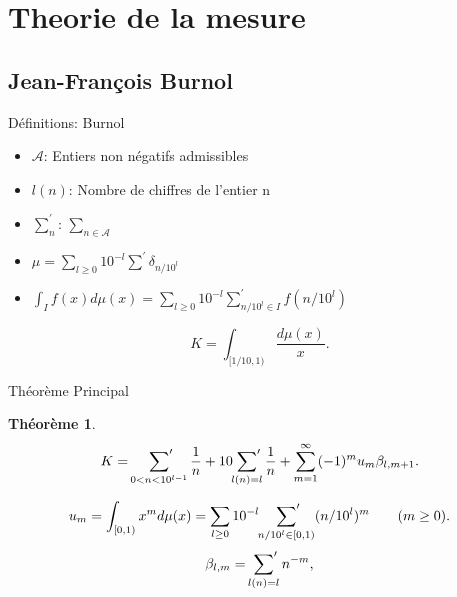 \documentclass{beamer}
\newcommand{\A}{\mathcal{A}}
\newcommand{\sump}{\sideset{}{'}\sum}
\newtheorem{thm}{Théorème}
\begin{document}
\section{Theorie de la mesure}
\subsection{Jean-François Burnol}

\begin{frame}{D\'efinitions: Burnol}
	\begin{itemize}
		\item $\A$: Entiers non n\'egatifs admissibles
		\item $l(n)$: Nombre de chiffres de l'entier n
		\item $\sum_{n}^{'}$: $\sum_{n \in \A}$
		\item $\mu = \sum_{l\ge0} 10^{-l}\sum^{'} \delta_{n/10^{l}}$

		\item $\int_{I} f(x)d\mu(x)= \sum_{l\ge0}10^{-l}\sum_{n/10^{l} \in I}^{'}
			f(n/10^{l})$
	\end{itemize}

	\vspace{0.5em}

	\[
		K = \int_{[1/10, 1)} \frac{d\mu(x)}{x}.
	\]

\end{frame}

\begin{frame}{Th\'eor\`eme Principal}
	\begin{thm}
		\[
			K = \sump_{0<n<10^{l-1}}\frac{1}{n} +
			10\sump_{l(n)=l}\frac{1}{n} +
			\sum_{m=1}^{\infty}(-1)^{m}u_{m}\beta_{l, m+1}.
		\]
	\end{thm}
	\[
		u_{m} = \int_{[0,1)}x^{m}d\mu(x) = \sum_{l\ge0}10^{-l}\sump_{n/10^{l}
		\in [0,1)} (n/10^{l})^{m} \qquad (m\ge0).
	\]
	\vspace{0.5em}
	\[
		\beta_{l, m} = \sump_{l(n)=l}n^{-m},
	\]
\end{frame}
\end{document}
